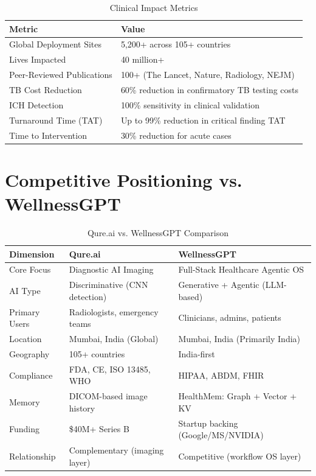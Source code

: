 \documentclass[12pt,a4paper]{article}
\begin{document}
\begin{table}[H]\centering\renewcommand{\arraystretch}{1.4}
\begin{tabularx}{\textwidth}{lX}\toprule
\textbf{Metric} & \textbf{Value}\\\midrule
Global Deployment Sites & 5,200+ across 105+ countries \\
Lives Impacted          & 40 million+ \\
Peer-Reviewed Publications & 100+ (The Lancet, Nature, Radiology, NEJM) \\
TB Cost Reduction       & 60\% reduction in confirmatory TB testing costs \\
ICH Detection           & 100\% sensitivity in clinical validation \\
Turnaround Time (TAT)   & Up to 99\% reduction in critical finding TAT \\
Time to Intervention    & 30\% reduction for acute cases \\
\bottomrule\end{tabularx}\caption{Clinical Impact Metrics}\end{table}

\section{Competitive Positioning vs. WellnessGPT}

\begin{table}[H]\centering\renewcommand{\arraystretch}{1.5}
\begin{tabularx}{\textwidth}{lXX}\toprule
\textbf{Dimension} & \textbf{Qure.ai} & \textbf{WellnessGPT}\\\midrule
Core Focus      & Diagnostic AI Imaging        & Full-Stack Healthcare Agentic OS \\
AI Type         & Discriminative (CNN detection) & Generative + Agentic (LLM-based) \\
Primary Users   & Radiologists, emergency teams & Clinicians, admins, patients \\
Location        & Mumbai, India (Global)        & Mumbai, India (Primarily India) \\
Geography       & 105+ countries                & India-first \\
Compliance      & FDA, CE, ISO 13485, WHO       & HIPAA, ABDM, FHIR \\
Memory          & DICOM-based image history    & HealthMem: Graph + Vector + KV \\
Funding         & \$40M+ Series B              & Startup backing (Google/MS/NVIDIA) \\
Relationship    & Complementary (imaging layer) & Competitive (workflow OS layer) \\
\bottomrule\end{tabularx}\caption{Qure.ai vs. WellnessGPT Comparison}\end{table}
\end{document}
